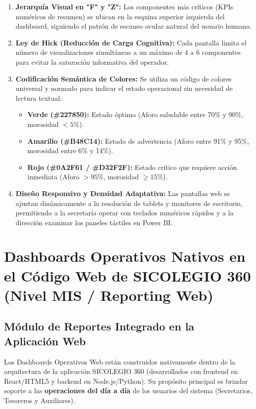 \documentclass[12pt,a4paper,oneside]{report}
\begin{document}
\begin{enumerate}
    \item \textbf{Jerarquía Visual en "F" y "Z":} Los componentes más críticos (KPIs numéricos de resumen) se ubican en la esquina superior izquierda del dashboard, siguiendo el patrón de escaneo ocular natural del usuario humano.
    \item \textbf{Ley de Hick (Reducción de Carga Cognitiva):} Cada pantalla limita el número de visualizaciones simultáneas a un máximo de 4 a 6 componentes para evitar la saturación informativa del operador.
    \item \textbf{Codificación Semántica de Colores:} Se utiliza un código de colores universal y normado para indicar el estado operacional sin necesidad de lectura textual:
    \begin{itemize}
        \item \textbf{Verde (\#227850):} Estado óptimo (Aforo saludable entre 70\% y 90\%, morosidad $<5\%$).
        \item \textbf{Amarillo (\#B48C14):} Estado de advertencia (Aforo entre 91\% y 95\%, morosidad entre 6\% y 14\%).
        \item \textbf{Rojo (\#0A2F61 / \#D32F2F):} Estado crítico que requiere acción inmediata (Aforo $>95\%$, morosidad $\ge 15\%$).
    \end{itemize}
    \item \textbf{Diseño Responsivo y Densidad Adaptativa:} Las pantallas web se ajustan dinámicamente a la resolución de tablets y monitores de escritorio, permitiendo a la secretaría operar con teclados numéricos rápidos y a la dirección examinar los paneles táctiles en Power BI.
\end{enumerate}

\chapter{Dashboards Operativos Nativos en el Código Web de SICOLEGIO 360 (Nivel MIS / Reporting Web)}

\section{Módulo de Reportes Integrado en la Aplicación Web}

Los Dashboards Operativos Web están construidos nativamente dentro de la arquitectura de la aplicación SICOLEGIO 360 (desarrollados con frontend en React/HTML5 y backend en Node.js/Python). Su propósito principal es brindar soporte a las \textbf{operaciones del día a día} de los usuarios del sistema (Secretarios, Tesoreros y Auxiliares).
\end{document}
